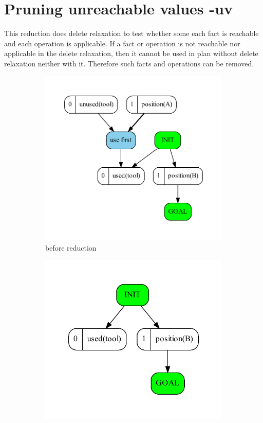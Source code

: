 
		
	\chapter{Pruning unreachable values -uv}
	
	This reduction does delete relaxation to test whether some each fact is reachable and each operation is applicable. If a fact or operation is not reachable nor applicable in the delete relaxation, then it cannot be used in plan without delete relaxation neither with it. Therefore such facts and operations can be removed. 
	
	\begin{figure}
		\begin{subfigure}[b]{0.4\textwidth}
			\includegraphics[scale=0.4]{unreachableValues/figures/simple_input}
			\caption{before reduction}
		\end{subfigure}	
		\begin{subfigure}[b]{0.4\textwidth}
			\includegraphics[scale=0.4]{unreachableValues/figures/simple_output}

\end{subfigure}
\end{figure}
